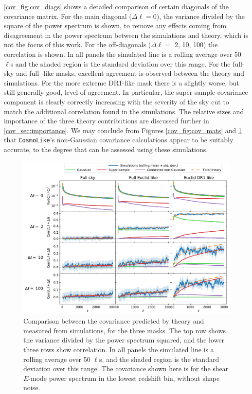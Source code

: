 \autoref{cov_fig:cov_diags} shows a detailed comparison of certain diagonals of the covariance matrix. For the main diagonal ($\Delta \ell = 0$), the variance divided by the square of the power spectrum is shown, to remove any effects coming from disagreement in the power spectrum between the simulations and theory, which is not the focus of this work. For the off-diagonals ($\Delta \ell =$ 2, 10, 100) the correlation is shown.
In all panels the simulated line is a rolling average over 50 $\ell$s and the shaded region is the standard deviation over this range. For the full-sky and full \Euclid{}-like masks, excellent agreement is observed between the theory and simulations. For the more extreme \Euclid{} DR1-like mask there is a slightly worse, but still generally good, level of agreement. In particular, the super-sample covariance component is clearly correctly increasing with the severity of the sky cut to match the additional correlation found in the simulations. The relative sizes and importance of the three theory contributions are discussed further in \autoref{cov_sec:importance}.
We may conclude from Figures \ref{cov_fig:cov_mats} and \ref{cov_fig:cov_diags} that \texttt{CosmoLike}'s non-Gaussian covariance calculations appear to be suitably accurate, to the degree that can be assessed using these simulations.

\begin{figure}
\includegraphics[width=\textwidth]{cov_diags}
\caption{Comparison between the covariance predicted by theory and measured from simulations, for the three masks. The top row shows the variance divided by the power spectrum squared, and the lower three rows show correlation. In all panels the simulated line is a rolling average over 50 $\ell$s, and the shaded region is the standard deviation over this range. The covariance shown here is for the shear $E$-mode power spectrum in the lowest redshift bin, without shape noise.}
\label{cov_fig:cov_diags}
\end{figure}


